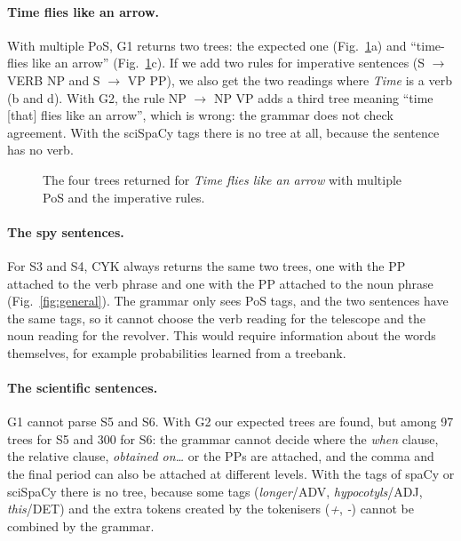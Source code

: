 \documentclass[11pt,a4paper]{article}
\begin{document}
\paragraph{Time flies like an arrow.} With multiple PoS, G1 returns two trees: the expected one (Fig.~\ref{fig:timeflies}a) and ``time-flies like an arrow'' (Fig.~\ref{fig:timeflies}c). If we add two rules for imperative sentences (S $\to$ VERB NP and S $\to$ VP PP), we also get the two readings where \emph{Time} is a verb (b and d). With G2, the rule NP $\to$ NP VP adds a third tree meaning ``time [that] flies like an arrow'', which is wrong: the grammar does not check agreement. With the sciSpaCy tags there is no tree at all, because the sentence has no verb.

\begin{figure}[h]\centering

\caption{The four trees returned for \emph{Time flies like an arrow} with multiple PoS and the imperative rules.}\label{fig:timeflies}
\end{figure}

\paragraph{The spy sentences.} For S3 and S4, CYK always returns the same two trees, one with the PP attached to the verb phrase and one with the PP attached to the noun phrase (Fig.~\ref{fig:general}). The grammar only sees PoS tags, and the two sentences have the same tags, so it cannot choose the verb reading for the telescope and the noun reading for the revolver. This would require information about the words themselves, for example probabilities learned from a treebank.

\paragraph{The scientific sentences.} G1 cannot parse S5 and S6. With G2 our expected trees are found, but among 97 trees for S5 and 300 for S6: the grammar cannot decide where the \emph{when} clause, the relative clause, \emph{obtained on\ldots} or the PPs are attached, and the comma and the final period can also be attached at different levels. With the tags of spaCy or sciSpaCy there is no tree, because some tags (\emph{longer}/ADV, \emph{hypocotyls}/ADJ, \emph{this}/DET) and the extra tokens created by the tokenisers (\emph{+}, \emph{-}) cannot be combined by the grammar.
\end{document}

